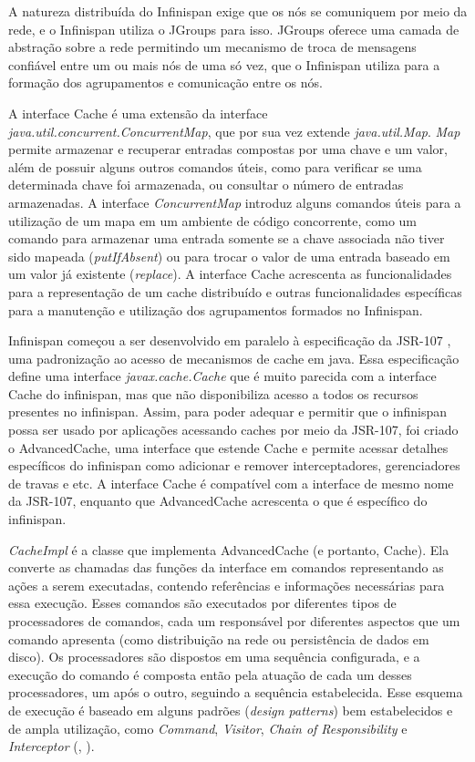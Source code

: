 \documentclass[11pt,twoside,a4paper]{book}
\begin{document}
A natureza distribuída do Infinispan exige que os nós se comuniquem por meio da rede, e o Infinispan utiliza o JGroups \cite{jgroups} para isso. JGroups oferece uma camada de abstração sobre a rede permitindo um mecanismo de troca de mensagens confiável entre um ou mais nós de uma só vez, que o Infinispan utiliza para a formação dos agrupamentos e comunicação entre os nós.

A interface Cache é uma extensão da interface \emph{java.util.concurrent.ConcurrentMap}, que por sua vez extende \emph{java.util.Map}. \emph{Map} permite armazenar e recuperar entradas compostas por uma chave e um valor, além de possuir alguns outros comandos úteis, como para verificar se uma determinada chave foi armazenada, ou consultar o número de entradas armazenadas. A interface \emph{ConcurrentMap} introduz alguns comandos úteis para a utilização de um mapa em um ambiente de código concorrente, como um comando para armazenar uma entrada somente se a chave associada não tiver sido mapeada (\emph{putIfAbsent}) ou para trocar o valor de uma entrada baseado em um valor já existente (\emph{replace}). A interface Cache acrescenta as funcionalidades para a representação de um cache distribuído e outras funcionalidades específicas para a manutenção e utilização dos agrupamentos formados no Infinispan.

Infinispan começou a ser desenvolvido em paralelo à especificação da JSR-107 \cite{jsr107}, uma padronização ao acesso de mecanismos de cache em java. Essa especificação define uma interface \emph{javax.cache.Cache} que é muito parecida com a interface Cache do infinispan, mas que não disponibiliza acesso a todos os recursos presentes no infinispan. Assim, para poder adequar e permitir que o infinispan possa ser usado por aplicações acessando caches por meio da JSR-107, foi criado o AdvancedCache, uma interface que estende Cache e permite acessar detalhes específicos do infinispan como adicionar e remover interceptadores, gerenciadores de travas e etc. A interface Cache é compatível com a interface de mesmo nome da JSR-107, enquanto que AdvancedCache acrescenta o que é específico do infinispan.

\emph{CacheImpl} é a classe que implementa AdvancedCache (e portanto, Cache). Ela converte as chamadas das funções da interface em comandos representando as ações a serem executadas, contendo referências e informações necessárias para essa execução. Esses comandos são executados por diferentes tipos de processadores de comandos, cada um responsável por diferentes aspectos que um comando apresenta (como distribuição na rede ou persistência de dados em disco). Os processadores são dispostos em uma sequência configurada, e a execução do comando é composta então pela atuação de cada um desses processadores, um após o outro, seguindo a sequência estabelecida. Esse esquema de execução é baseado em alguns padrões (\emph{design patterns}) bem estabelecidos e de ampla utilização, como \emph{Command}, \emph{Visitor}, \emph{Chain of Responsibility} e \emph{Interceptor} (\cite{design_patterns}, \cite{posa}).
\end{document}
